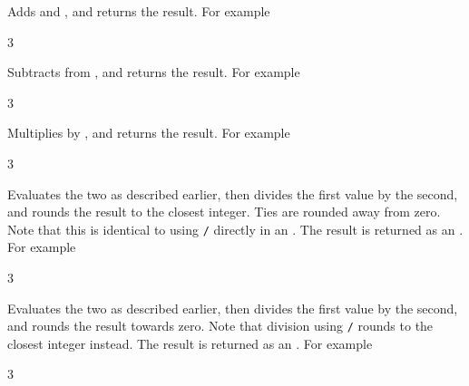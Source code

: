\documentclass[oneside]{book}
\begin{document}
\begin{function}{\IntMathAdd}
\begin{syntax}
  
\end{syntax}
Adds  and ,
and returns the result. For example
\begin{demohigh}
 {3}
\end{demohigh}
\end{function}

\begin{function}{\IntMathSub}
\begin{syntax}
  
\end{syntax}
Subtracts  from ,
and returns the result. For example
\begin{demohigh}
 {3}
\end{demohigh}
\end{function}

\begin{function}{\IntMathMult}
\begin{syntax}
  
\end{syntax}
Multiplies  by ,
and returns the result. For example
\begin{demohigh}
 {3}
\end{demohigh}
\end{function}

\begin{function}{\IntMathDiv}
\begin{syntax}
  
\end{syntax}
Evaluates the two  as described earlier,
then divides the first value by the second, and rounds the result
to the closest integer. Ties are rounded away from zero. Note that
this is identical to using \verb|/| directly in an .
The result is returned as an .
For example
\begin{demohigh}
 {3}
\end{demohigh}
\end{function}

\begin{function}{\IntMathDivTrancate}
\begin{syntax}
  
\end{syntax}
Evaluates the two  as described earlier,
then divides the first value by the second, and rounds the result towards zero.
Note that division using \verb|/| rounds to the closest integer instead.
The result is returned as an .
For example
\begin{demohigh}
 {3}
\end{demohigh}
\end{function}
\end{document}
